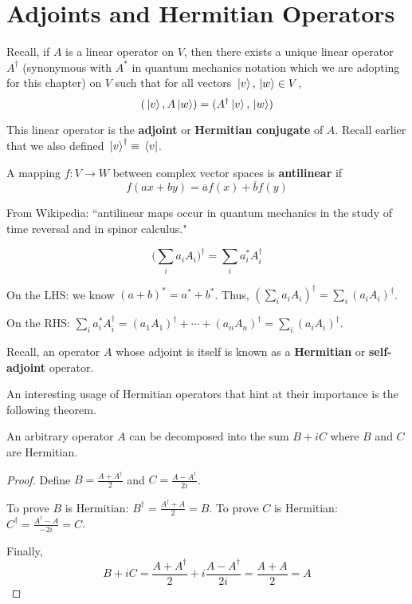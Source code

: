 \section{Adjoints and Hermitian Operators} 

Recall, if $A$ is a linear operator on $V$, then there exists a unique linear operator $A^{\dagger}$ (synonymous with $A^{*}$ in quantum mechanics notation which we are adopting for this chapter) on $V$ such that for all vectors $\ket*{v}, \ket*{w} \in V$, 
$$(\ket*{v}, A\ket*{w}) = (A^{\dagger}\ket*{v}, \ket*{w})$$

This linear operator is the \textbf{adjoint} or \textbf{Hermitian conjugate} of $A$. Recall earlier that we also defined $\ket*{v}^{\dagger} \equiv \bra*{v}$.

\begin{definition}
A mapping $f: V \rightarrow W$ between complex vector spaces is \textbf{antilinear} if 
$$f(ax + by) = \overline{a} f(x) + \overline{b} f(y)$$

From Wikipedia: ``antilinear maps occur in quantum mechanics in the study of time reversal and in spinor calculus."
\end{definition}

\begin{lemma}
$$\Bigg( \sum_{i} a_{i} A_{i} \Bigg)^{\dagger} = \sum_{i} a_{i}^{*} A_{i}^{\dagger}$$
\end{lemma}

\begin{lproof}
On the LHS: we know $(a + b)^{*} = a^{*} + b^{*}$. Thus, $(\sum_{i} a_{i}A_{i})^{\dagger} = \sum_{i} (a_{i}A_{i})^{\dagger}$.

On the RHS: $\sum_{i} a_{i}^{*} A_{i}^{\dagger} = (a_{1} A_{1})^{\dagger} + \cdots + (a_{n} A_{n})^{\dagger} = \sum_{i} (a_{i} A_{i})^{\dagger}$. 
\end{lproof}

Recall, an operator $A$ whose adjoint is itself is known as a \textbf{Hermitian} or \textbf{self-adjoint} operator. 

An interesting usage of Hermitian operators that hint at their importance is the following theorem. 

\begin{theorem}
An arbitrary operator $A$ can be decomposed into the sum $B + iC$ where $B$ and $C$ are Hermitian.
\end{theorem}

\begin{proof}
Define $B = \frac{A + A^{\dagger}}{2}$ and $C = \frac{A - A^{\dagger}}{2i}$. 

To prove $B$ is Hermitian: $B^{\dagger} = \frac{A^{\dagger} + A}{2} = B$. To prove $C$ is Hermitian: $C^{\dagger} = \frac{A^{\dagger} - A}{-2i} = C$. 

Finally, 
$$B + iC = \frac{A + A^{\dagger}}{2} + i \frac{A - A^{\dagger}}{2i} = \frac{A + A}{2} = A$$
\end{proof}

